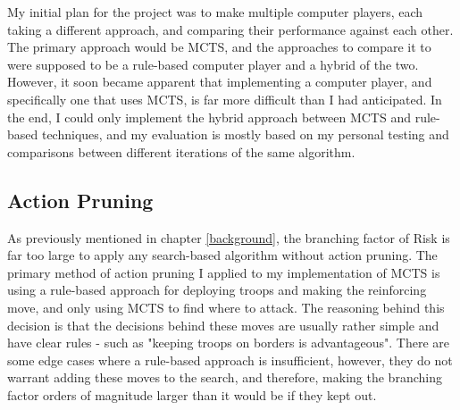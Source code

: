 My initial plan for the project was to make multiple computer players, each taking a different approach, and comparing their performance against each other. The primary approach would be MCTS, and the approaches to compare it to were supposed to be a rule-based computer player and a hybrid of the two. However, it soon became apparent that implementing a computer player, and specifically one that uses MCTS, is far more difficult than I had anticipated. In the end, I could only implement the hybrid approach between MCTS and rule-based techniques, and my evaluation is mostly based on my personal testing and comparisons between different iterations of the same algorithm.

\subsection{Action Pruning}
\label{actionPruning}

As previously mentioned in chapter \ref{background}, the branching factor of Risk is far too large to apply any search-based algorithm without action pruning. The primary method of action pruning I applied to my implementation of MCTS is using a rule-based approach for deploying troops and making the reinforcing move, and only using MCTS to find where to attack. The reasoning behind this decision is that the decisions behind these moves are usually rather simple and have clear rules - such as "keeping troops on borders is advantageous". There are some edge cases where a rule-based approach is insufficient, however, they do not warrant adding these moves to the search, and therefore, making the branching factor orders of magnitude larger than it would be if they kept out.

